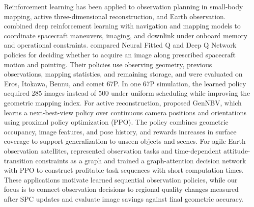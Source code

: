 Reinforcement learning has been applied to observation planning in small-body mapping, active three-dimensional reconstruction, and Earth observation. \citet{chan2019mapping} combined deep reinforcement learning with navigation and mapping models to coordinate spacecraft maneuvers, imaging, and downlink under onboard memory and operational constraints. \citet{piccinin2022} compared Neural Fitted Q and Deep Q Network policies for deciding whether to acquire an image along prescribed spacecraft motion and pointing. Their policies use observing geometry, previous observations, mapping statistics, and remaining storage, and were evaluated on Eros, Itokawa, Bennu, and comet 67P. In one 67P simulation, the learned policy acquired 285 images instead of 500 under uniform scheduling while improving the geometric mapping index. For active reconstruction, \citet{chen2024} proposed GenNBV, which learns a next-best-view policy over continuous camera positions and orientations using proximal policy optimization (PPO). The policy combines geometric occupancy, image features, and pose history, and rewards increases in surface coverage to support generalization to unseen objects and scenes. For agile Earth-observation satellites, \citet{chun2023scheduling} represented observation tasks and time-dependent attitude-transition constraints as a graph and trained a graph-attention decision network with PPO to construct profitable task sequences with short computation times. These applications motivate learned sequential observation policies, while our focus is to connect observation decisions to regional quality changes measured after SPC updates and evaluate image savings against final geometric accuracy.





% 
